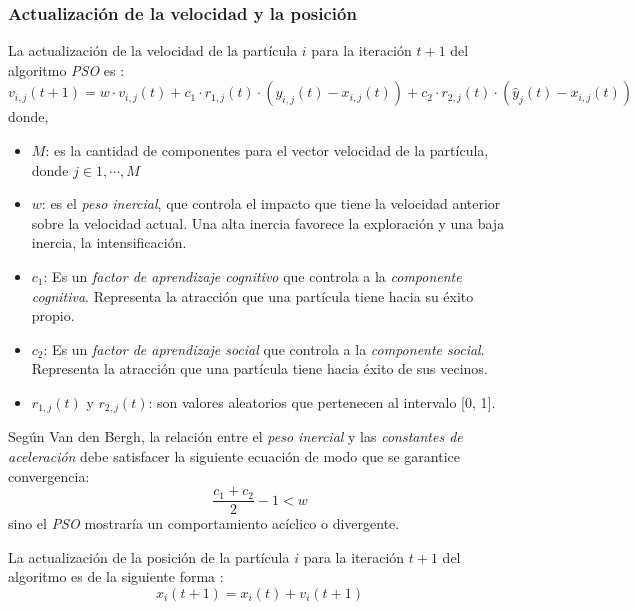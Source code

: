 \subsubsection{Actualización de la velocidad y la posición}\label{sect:metapso-vel}

    La actualización de la velocidad de la partícula $i$ para la iteración
$t + 1$ del algoritmo \emph{PSO} es \cite{PSO_0}:
\begin{equation}\label{pso: vi}
v_{i,j}(t + 1) = w \cdot v_{i,j}(t) + c_1 \cdot r_{1,j}(t) \cdot (y_{i,j}(t) - x_{i,j}(t)) + c_2 \cdot r_{2,j}(t) \cdot (\hat{y}_j(t) - x_{i,j}(t))
\end{equation}
donde,
\begin{itemize}
    \item $M$: es la cantidad de componentes para el vector velocidad de la
partícula, donde $j \in {1, \cdots, M}$
    \item $w$: es el \emph{peso inercial}, que controla el impacto que tiene la
velocidad anterior sobre la velocidad actual. Una alta inercia favorece la
exploración y una baja inercia, la intensificación.
    \item $c_1$: Es un \emph{factor de aprendizaje cognitivo} que controla a la
\emph{componente cognitiva}. Representa la atracción que una partícula tiene
hacia su éxito propio.
    \item $c_2$: Es un \emph{factor de aprendizaje social} que controla a la
\emph{componente social}. Representa la atracción que una partícula tiene hacia
éxito de sus vecinos.
    \item $r_{1,j}(t)$ y $r_{2,j}(t)$: son valores aleatorios que pertenecen al
intervalo [0, 1].
\end{itemize}

    Según Van den Bergh\cite{PSO_3}, la relación entre el \emph{peso inercial} y
las \emph{constantes de aceleración} debe satisfacer la siguiente ecuación de
modo que se garantice convergencia:
\begin{equation}\label{pso: convergece}
\displaystyle\frac{c_1 + c_2}{2} - 1 < w
\end{equation}
sino el \emph{PSO} mostraría un comportamiento acíclico o divergente.

    La actualización de la posición de la partícula $i$ para la iteración
$t + 1$ del algoritmo es de la siguiente forma \cite{PSO_0}:
\begin{equation}\label{pso: xi}
x_i(t + 1) = x_i(t) + v_i(t + 1)
\end{equation}

